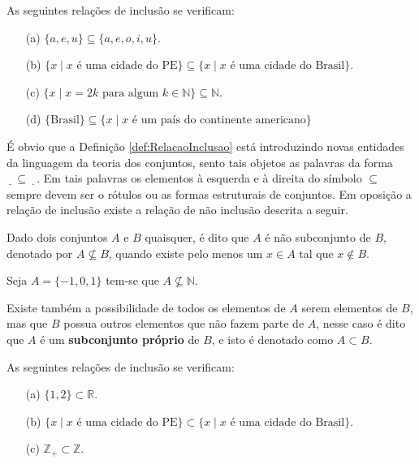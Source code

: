 \begin{example}\label{exe:Inclusao}
	As seguintes relações de inclusão se verificam:
	\begin{itemize}
		\item[(a)] $\{a, e, u\} \subseteq \{a, e, o, i , u\}$.
		\item[(b)] $\{x \mid x \mbox{ é uma cidade do PE}\} \subseteq \{x \mid x \mbox{ é uma cidade do Brasil}\}$.
		\item[(c)] $\{x \mid x = 2k \mbox{ para algum } k \in \mathbb{N}\} \subseteq \mathbb{N}$.
		\item[(d)] $\{\mbox{Brasil}\} \subseteq \{x \mid x \mbox{ é um país do continente americano}\}$
	\end{itemize}
\end{example}

É obvio que a Definição \ref{def:RelacaoInclusao} está introduzindo novas entidades da linguagem da teoria dos conjuntos, sento tais objetos as palavras da forma $\underline{\ \ \ } \subseteq \underline{\ \ \ }$. Em tais palavras os elementos à esquerda e à direita do símbolo $\subseteq$ sempre devem ser o rótulos ou as formas estruturais de conjuntos. Em oposição a relação de inclusão existe a relação de não inclusão descrita a seguir.

\begin{definition}\label{def:RelacaoNaoInclusao}
	Dado dois conjuntos $A$ e $B$ quaisquer, é dito que $A$ é não subconjunto de $B$, denotado por $A \not\subseteq B$, quando existe pelo menos um $x \in A$ tal que $x \not\in B$.
\end{definition}

\begin{example}\label{exe:NaoInclusao}
	Seja $A = \{-1, 0, 1\}$ tem-se que $A \not\subseteq \mathbb{N}$.
\end{example}

Existe também a possibilidade de todos os elementos de $A$ serem elementos de $B$, mas que $B$ possua outros elementos que não fazem parte de $A$, nesse caso é dito que $A$ é um \textbf{subconjunto próprio} de $B$, e isto é denotado como $A \subset B$. 

\begin{example}\label{exe:InclusaoPropria}
	As seguintes relações de inclusão se verificam:
	\begin{itemize}
		\item[(a)] $\{1, 2\} \subset \mathbb{R}$.
		\item[(b)] $\{x \mid x \mbox{ é uma cidade do PE}\} \subset \{x \mid x \mbox{ é uma cidade do Brasil}\}$.
		\item[(c)] $\mathbb{Z}_+ \subset \mathbb{Z}$.
	\end{itemize}
\end{example}

